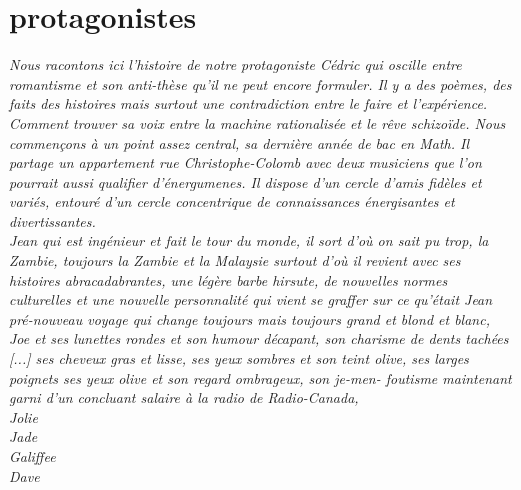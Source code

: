 \documentclass{article}
\begin{document}
\renewcommand{\baselinestretch}{1.25}

\section{protagonistes}

\textit{Nous racontons ici l'histoire de notre protagoniste Cédric qui oscille
  entre romantisme et son anti-thèse qu'il ne peut encore formuler. Il y a des
  poèmes, des faits des histoires mais surtout une contradiction entre le faire
  et l'expérience. Comment trouver sa voix entre la machine rationalisée et le
  rêve schizoïde. Nous commençons à un point assez central, sa dernière année de
  bac en Math. Il partage un appartement rue Christophe-Colomb avec deux
  musiciens que l'on pourrait aussi qualifier d'énergumenes. Il dispose d'un
  cercle d'amis fidèles et variés, entouré d'un cercle concentrique de
  connaissances énergisantes et divertissantes.}\\


\textit{Jean qui est ingénieur et fait le tour du monde, il sort d’où on sait pu
  trop, la Zambie, toujours la Zambie et la Malaysie surtout d’où il revient
  avec ses histoires abracadabrantes, une légère barbe hirsute, de nouvelles
  normes culturelles et une nouvelle personnalité qui vient se graffer sur ce
  qu’était Jean pré-nouveau voyage qui change toujours mais toujours grand et
  blond et blanc,}\\

\textit{Joe et ses lunettes rondes et son humour décapant, son charisme de dents
  tachées [...] ses cheveux gras et lisse, ses yeux sombres et son teint olive,
  ses larges poignets ses yeux olive et son regard ombrageux, son je-men-
  foutisme maintenant garni d’un concluant salaire à la radio de Radio-Canada,}\\


\textit{Jolie}\\

\textit{Jade}\\

\textit{Galiffee}\\

\textit{Dave}\\

\clearpage
\end{document}
